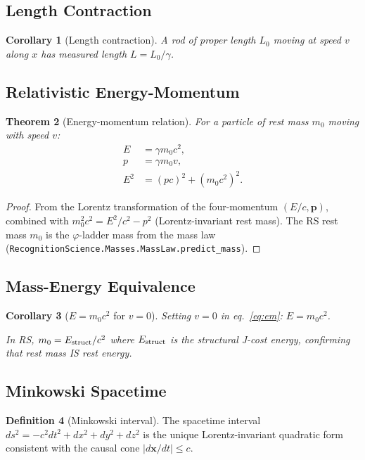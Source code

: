 \documentclass[12pt,a4paper]{article}
\newtheorem{theorem}{Theorem}[section]
\newtheorem{corollary}[theorem]{Corollary}
\theoremstyle{definition}
\newtheorem{definition}[theorem]{Definition}
\theoremstyle{remark}
\begin{document}
\subsection{Length Contraction}

\begin{corollary}[Length contraction]\label{cor:lc}
A rod of proper length $L_0$ moving at speed $v$ along $x$ has measured
length $L = L_0/\gamma$.
\end{corollary}

\subsection{Relativistic Energy-Momentum}

\begin{theorem}[Energy-momentum relation]\label{thm:em}
For a particle of rest mass $m_0$ moving with speed $v$:
\begin{align}
  E &= \gamma m_0 c^2, \\
  p &= \gamma m_0 v, \\
  E^2 &= (pc)^2 + (m_0 c^2)^2.
  \label{eq:em}
\end{align}
\end{theorem}

\begin{proof}
From the Lorentz transformation of the four-momentum $(E/c, \mathbf{p})$,
combined with $m_0^2 c^2 = E^2/c^2 - p^2$ (Lorentz-invariant rest mass).
The RS rest mass $m_0$ is the $\varphi$-ladder mass from the mass law
(\texttt{RecognitionScience.Masses.MassLaw.predict\_mass}).
\end{proof}

\subsection{Mass-Energy Equivalence}

\begin{corollary}[$E = m_0 c^2$ for $v=0$]
Setting $v = 0$ in eq.~\eqref{eq:em}: $E = m_0 c^2$.

In RS, $m_0 = E_{\rm struct}/c^2$ where $E_{\rm struct}$ is the
structural J-cost energy, confirming that rest mass IS rest energy.
\end{corollary}

\subsection{Minkowski Spacetime}

\begin{definition}[Minkowski interval]
The spacetime interval $ds^2 = -c^2 dt^2 + dx^2 + dy^2 + dz^2$ is
the unique Lorentz-invariant quadratic form consistent with the causal
cone $|d\mathbf{x}/dt| \leq c$.
\end{definition}
\end{document}

